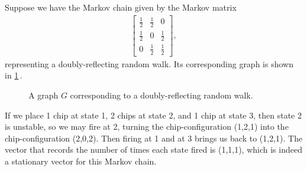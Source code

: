 \begin{example}\label{example: 3 chip}
Suppose we have the Markov chain given by the Markov matrix
\begin{align*}
    \begin{bmatrix}
        \frac{1}{2} & \frac{1}{2} & 0 \\
        \frac{1}{2} & 0 & \frac{1}{2} \\
        0 & \frac{1}{2} & \frac{1}{2}
    \end{bmatrix},
\end{align*}
representing a doubly-reflecting random walk.
Its corresponding graph is shown in \cref{fig:ex2G}\,.
\begin{figure}[htbp]
    \centering
    \caption{A graph $G$ corresponding to a doubly-reflecting random walk.}
    \label{fig:ex2G}
\end{figure}
If we place 1 chip at state 1, 2 chips at state 2, and 1 chip at state 3,
then state 2 is unstable, so we may fire at 2,
turning the chip-configuration (1,2,1) into the chip-configuration (2,0,2).
Then firing at 1 and at 3 brings us back to (1,2,1).
The vector that records the number of times each state fired
is (1,1,1), which is indeed a stationary vector for this Markov chain.
\end{example}

